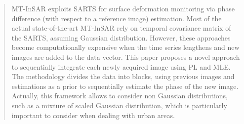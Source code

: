 \begin{abstract}
    \ac{MT-InSAR} exploits \ac{SARTS} for surface deformation monitoring via phase difference (with respect to a reference image) estimation. Most of the actual state-of-the-art \acs{MT-InSAR} rely on temporal covariance matrix of the \acs{SARTS}, assuming Gaussian distribution.
    However, these approaches become computationally expensive when the time series lengthens and new images are added to the data vector. 
    This paper proposes a novel approach to sequentially integrate each newly acquired image using \ac{PL} and %
    \ac{MLE}.
    The methodology divides the data into blocks, using previous images and estimations as a prior to sequentially estimate the phase of the new image. Actually, this framework allows to consider non Gaussian distributions, such as a mixture of scaled Gaussian distribution, which is particularly important to consider when dealing with urban areas.  
    
\end{abstract}

